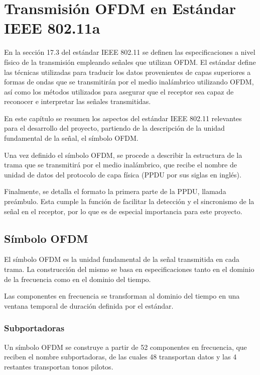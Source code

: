 \chapter{Transmisión OFDM en Estándar IEEE 802.11a}
\label{Ch:2}
\graphicspath{{figs/}}

En la sección 17.3 del estándar IEEE 802.11\cite{ieee} se definen las especificaciones a nivel físico de la transmisión empleando señales que utilizan OFDM. El estándar define las técnicas utilizadas para traducir los datos provenientes de capas superiores a formas de ondas que se transmitirán por el medio inalámbrico utilizando OFDM, así como los métodos utilizados para asegurar que el receptor sea capaz de reconocer e interpretar las señales transmitidas.

En este capítulo se resumen los aspectos del estándar IEEE 802.11 relevantes para el desarrollo del proyecto, partiendo de la descripción de la unidad fundamental de la señal, el símbolo OFDM.

Una vez definido el símbolo OFDM, se procede a describir la estructura de la trama que se transmitirá por el medio inalámbrico, que recibe el nombre de unidad de datos del protocolo de capa física (PPDU por sus siglas en inglés).

Finalmente, se detalla el formato la primera parte de la PPDU, llamada preámbulo. Esta cumple la función de facilitar la detección y el sincronismo de la señal en el receptor, por lo que es de especial importancia para este proyecto.

\section{Símbolo OFDM}
\label{S:ch2-simbolo}

El símbolo OFDM es la unidad fundamental de la señal transmitida en cada trama. La construcción del mismo se basa en especificaciones tanto en el dominio de la frecuencia como en el dominio del tiempo.

Las componentes en frecuencia se transforman al dominio del tiempo en una ventana temporal de duración definida por el estándar. 

\subsection{Subportadoras}
\label{Ss:ch2-subportadoras}

Un símbolo OFDM se construye a partir de 52 componentes en frecuencia, que reciben el nombre subportadoras, de las cuales 48 transportan datos y las 4 restantes transportan tonos pilotos. 

